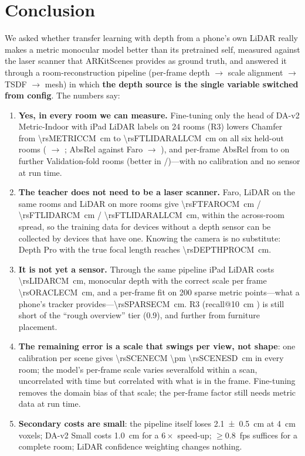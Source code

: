 \section{Conclusion}
We asked whether transfer learning with depth from a phone's own LiDAR really makes a metric monocular model better than
its pretrained self, measured against the laser scanner that ARKitScenes provides as ground truth, and answered it
through a room-reconstruction pipeline (per-frame depth $\rightarrow$ scale alignment $\rightarrow$ TSDF $\rightarrow$
mesh) in which \textbf{the depth source is the single variable switched from config}. The numbers say:
\begin{enumerate}
\item \textbf{Yes, in every room we can measure.} Fine-tuning only the head of DA-v2 Metric-Indoor with iPad LiDAR
labels on 24 rooms (R3) lowers Chamfer from \SI{\rsMETRICCM}{cm} to \SI{\rsFTLIDARALLCM}{cm} on all six held-out rooms
(\fscore{} \rsMETRICF{} $\rightarrow$ \rsFTLIDARALLF; AbsRel against Faro \rsMETRICSIXABSREL{} $\rightarrow$
\rsFTLIDARALLABSREL), and per-frame AbsRel from \rsVMETRICABSREL{} to \rsVFTALLABSREL{} on \rsVN{} further
Validation-fold rooms (better in \rsVWINS/\rsVN)---with no calibration and no sensor at run time.
\item \textbf{The teacher does not need to be a laser scanner.} Faro, LiDAR on the same rooms and LiDAR on more rooms
give \SI{\rsFTFAROCM}{cm} / \SI{\rsFTLIDARCM}{cm} / \SI{\rsFTLIDARALLCM}{cm}, within the across-room spread, so the
training data for devices without a depth sensor can be collected by devices that have one. Knowing the camera is no
substitute: Depth Pro with the true focal length reaches \SI{\rsDEPTHPROCM}{cm}.
\item \textbf{It is not yet a sensor.} Through the same pipeline iPad LiDAR costs \SI{\rsLIDARCM}{cm}, monocular depth
with the correct scale per frame \SI{\rsORACLECM}{cm}, and a per-frame fit on 200 sparse metric points---what a phone's
tracker provides---\SI{\rsSPARSECM}{cm}. R3 (recall@\SI{10}{cm} \rsFTLIDARALLRten) is still short of the ``rough overview'' tier
(0.9), and further from furniture placement.
\item \textbf{The remaining error is a scale that swings per view, not shape}: one calibration per scene gives
\SI{\rsSCENECM \pm \rsSCENESD}{cm} in every room; the model's per-frame scale varies severalfold within a scan,
uncorrelated with time but correlated with what is in the frame. Fine-tuning removes the domain bias of that scale;
the per-frame factor still needs metric data at run time.
\item \textbf{Secondary costs are small}: the pipeline itself loses \SI{2.1 \pm 0.5}{cm} at \SI{4}{cm} voxels; DA-v2
Small costs \SI{1.0}{cm} for a $6\times$ speed-up; $\geq 0.8$~fps suffices for a complete room; LiDAR confidence
weighting changes nothing.
\end{enumerate}
